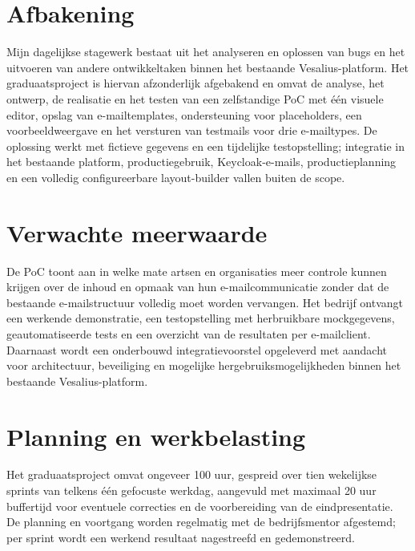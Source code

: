 \section{Afbakening}%
\label{vst:afbakening}
Mijn dagelijkse stagewerk bestaat uit het analyseren en oplossen van bugs en
het uitvoeren van andere ontwikkeltaken binnen het bestaande Vesalius-platform.
Het graduaatsproject is hiervan afzonderlijk afgebakend en omvat de analyse,
het ontwerp, de realisatie en het testen van een zelfstandige PoC met één
visuele editor, opslag van e-mailtemplates, ondersteuning voor placeholders,
een voorbeeldweergave en het versturen van testmails voor drie e-mailtypes.
De oplossing werkt met fictieve gegevens en een tijdelijke testopstelling;
integratie in het bestaande platform, productiegebruik, Keycloak-e-mails,
productieplanning en een volledig configureerbare layout-builder vallen buiten
de scope.

\section{Verwachte meerwaarde}%
\label{vst:meerwaarde}
De PoC toont aan in welke mate artsen en organisaties meer controle kunnen
krijgen over de inhoud en opmaak van hun e-mailcommunicatie zonder dat de
bestaande e-mailstructuur volledig moet worden vervangen. Het bedrijf ontvangt
een werkende demonstratie, een testopstelling met herbruikbare mockgegevens,
geautomatiseerde tests en een overzicht van de resultaten per e-mailclient.
Daarnaast wordt een onderbouwd integratievoorstel opgeleverd met aandacht voor
architectuur, beveiliging en mogelijke hergebruiksmogelijkheden binnen het
bestaande Vesalius-platform.


\section{Planning en werkbelasting}%
\label{vst:planning}
Het graduaatsproject omvat ongeveer 100 uur, gespreid over tien wekelijkse
sprints van telkens één gefocuste werkdag, aangevuld met maximaal 20 uur
buffertijd voor eventuele correcties en de voorbereiding van de eindpresentatie.
De planning en voortgang worden regelmatig met de bedrijfsmentor afgestemd;
per sprint wordt een werkend resultaat nagestreefd en gedemonstreerd.

